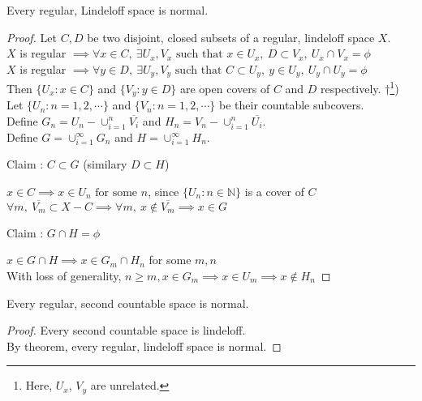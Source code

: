 \begin{theorem}
	Every regular, Lindeloff space is normal.
\end{theorem}
\begin{proof}
	Let $C,D$ be two disjoint, closed subsets of a regular, lindeloff space $X$.\\
	$X$ is regular $\implies \forall x \in C,\ \exists U_x, V_x \text{ such that } x \in U_x,\ D \subset V_x,\ U_x \cap V_x = \phi$\\
	$X$ is regular $\implies \forall y \in D,\ \exists U_y, V_y \text{ such that } C \subset U_y,\ y \in U_y,\ U_y \cap U_y = \phi$\\
	Then $\{ U_x : x \in C \}$ and $\{ V_y : y \in D \}$ are open covers of $C$ and $D$ respectively.
	$\dag$\footnote{Here, $U_x$, $V_y$ are unrelated.})\\
	Let $\{ U_n : n = 1,2,\cdots \}$ and $\{ V_n : n = 1,2,\cdots \}$ be their countable subcovers.\\
	Define $G_n = U_n - \cup_{i = 1}^n \overline{V_i}$ and $H_n = V_n - \cup_{i = 1}^n \overline{U_i}$.\\
	Define $G = \cup_{i = 1}^\infty G_n$ and $H = \cup_{i = 1}^\infty H_n$.\\
	\begin{important}
	Claim : $C \subset G$ (similary $D \subset H$)\\
	\end{important}
	$ x \in C \implies x \in U_n \text{ for some } n$, since $\{ U_n : n \in \mathbb{N} \}$ is a cover of $C$\\
	$\forall m,\ \overline{V_m} \subset X-C \implies \forall m,\ x \not\in \overline{V_m} \implies x \in G$\\
	\begin{important}
	Claim : $G \cap H = \phi$\\
	\end{important}
	$x \in G \cap H \implies x \in G_m \cap H_n$ for some $m,n$\\
	With loss of generality, $n \ge m, x \in G_m \implies x \in U_m \implies x \not\in H_n$
\end{proof}

\begin{corollary}
	Every regular, second countable space is normal.
\end{corollary}
\begin{proof}
	Every second countable space is lindeloff.\\
	By theorem, every regular, lindeloff space is normal.
\end{proof}


